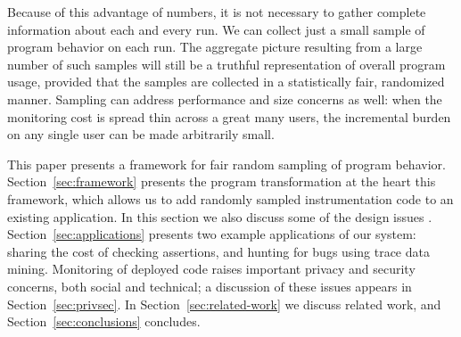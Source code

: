 Because of this advantage of numbers, it is not necessary to gather
complete information about each and every run.  We can collect just a
small sample of program behavior on each run.  The aggregate picture
resulting from a large number of such samples will still be a truthful
representation of overall program usage, provided that the samples are
collected in a statistically fair, randomized manner.  Sampling can
address performance and size concerns as well: when the monitoring
cost is spread thin across a great many users, the incremental burden
on any single user can be made arbitrarily small.

This paper presents a framework for fair random sampling of program
behavior.  Section~\ref{sec:framework} presents the program
transformation at the heart this framework, which allows us to add
randomly sampled instrumentation code to an existing application.  In
this section we also discuss some of the design issues
.  Section~\ref{sec:applications} presents two example
applications of our system: sharing the cost of checking assertions,
and hunting for bugs using trace data mining.  Monitoring of deployed
code raises important privacy and security concerns, both social and
technical; a discussion of these issues appears in
Section~\ref{sec:privsec}.  In Section~\ref{sec:related-work} we
discuss related work, and Section~\ref{sec:conclusions} concludes.


